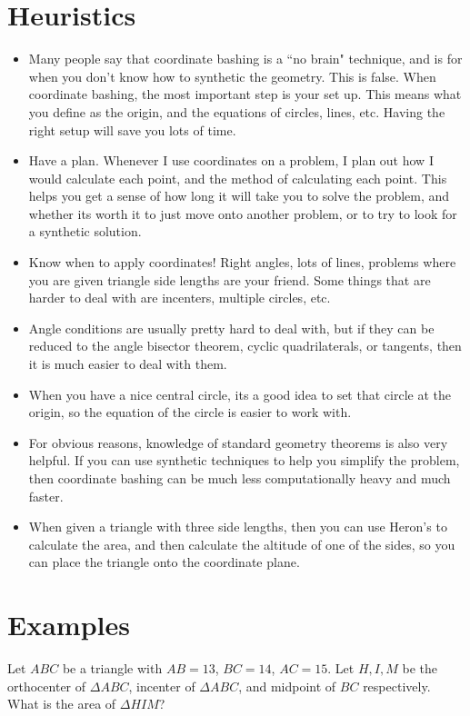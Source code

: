 \documentclass{article}
\begin{document}
\section{Heuristics}
\begin{itemize}
    \item Many people say that coordinate bashing is a ``no brain" technique, and is for when you don't know how to synthetic the geometry. This is false. When coordinate bashing, the most important step is your set up. This means what you define as the origin, and the equations of circles, lines, etc. Having the right setup will save you lots of time.
    \item Have a plan. Whenever I use coordinates on a problem, I plan out how I would calculate each point, and the method of calculating each point. This helps you get a sense of how long it will take you to solve the problem, and whether its worth it to just move onto another problem, or to try to look for a synthetic solution. 
    \item Know when to apply coordinates! Right angles, lots of lines, problems where you are given triangle side lengths are your friend. Some things that are harder to deal with are incenters, multiple circles, etc.
    \item Angle conditions are usually pretty hard to deal with, but if they can be reduced to the angle bisector theorem, cyclic quadrilaterals, or tangents, then it is much easier to deal with them. 
    \item When you have a nice central circle, its a good idea to set that circle at the origin, so the equation of the circle is easier to work with.
    \item For obvious reasons, knowledge of standard geometry theorems is also very helpful. If you can use synthetic techniques to help you simplify the problem, then coordinate bashing can be much less computationally heavy and much faster. 
    \item When given a triangle with three side lengths, then you can use Heron's to calculate the area, and then calculate the altitude of one of the sides, so you can place the triangle onto the coordinate plane. 
\end{itemize}

\section{Examples}
\begin{exam}[No Source]
Let $ABC$ be a triangle with $AB=13$, $BC=14$, $AC=15$. Let $H,I,M$ be the orthocenter of $\Delta ABC$, incenter of $\Delta ABC$, and midpoint of $BC$ respectively. What is the area of $\Delta HIM$?
\end{exam}
\end{document}
